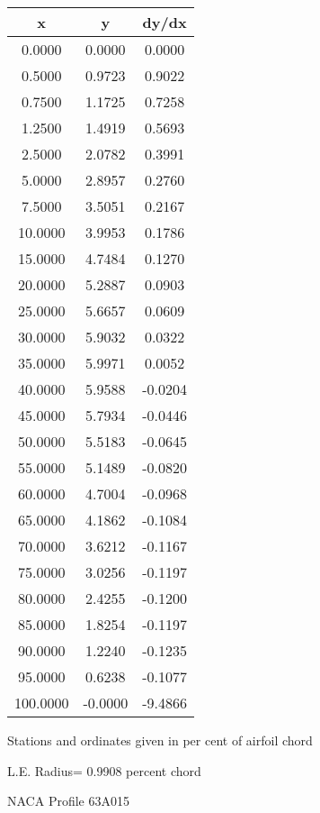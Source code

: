 \documentclass[11pt]{book}
\begin{document}
 \vspace{8mm}
 \begin{tabular}{|c|c|c|} \hline 
  x  &  y  &  dy/dx \\
 \hline
0.0000 & 0.0000 & 0.0000 \\
0.5000 & 0.9723 & 0.9022 \\
0.7500 & 1.1725 & 0.7258 \\
1.2500 & 1.4919 & 0.5693 \\
2.5000 & 2.0782 & 0.3991 \\
5.0000 & 2.8957 & 0.2760 \\
7.5000 & 3.5051 & 0.2167 \\
10.0000 & 3.9953 & 0.1786 \\
15.0000 & 4.7484 & 0.1270 \\
20.0000 & 5.2887 & 0.0903 \\
25.0000 & 5.6657 & 0.0609 \\
30.0000 & 5.9032 & 0.0322 \\
35.0000 & 5.9971 & 0.0052 \\
40.0000 & 5.9588 & -0.0204 \\
45.0000 & 5.7934 & -0.0446 \\
50.0000 & 5.5183 & -0.0645 \\
55.0000 & 5.1489 & -0.0820 \\
60.0000 & 4.7004 & -0.0968 \\
65.0000 & 4.1862 & -0.1084 \\
70.0000 & 3.6212 & -0.1167 \\
75.0000 & 3.0256 & -0.1197 \\
80.0000 & 2.4255 & -0.1200 \\
85.0000 & 1.8254 & -0.1197 \\
90.0000 & 1.2240 & -0.1235 \\
95.0000 & 0.6238 & -0.1077 \\
100.0000 & -0.0000 & -9.4866 \\
 \hline
 \end{tabular}
 \vspace{8mm}


Stations and ordinates given in per cent of airfoil chord 


L.E. Radius=  0.9908 percent chord
 \newpage
  \label{p63A015}
 \begin{Large}
 NACA Profile 63A015
 \end{Large}
  
\end{document}
